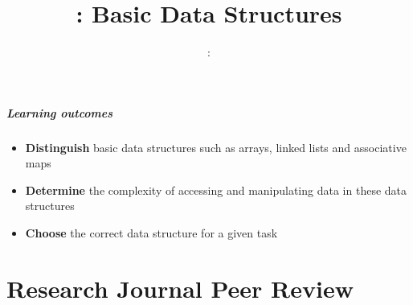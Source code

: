 \usepackage{../../beamerthemeFalmouthGamesAcademy}
\usepackage{multimedia}
\graphicspath{ {../../} }

\lstset{language=Python
}

\usepackage[normalem]{ulem}
\usepackage{wasysym}

\usepackage{algpseudocode}

\usepackage{pdfpages}

\usetikzlibrary{arrows,automata}
\usetikzlibrary{tikzmark,calc}




\title{\sessionnumber: Basic Data Structures}
\subtitle{\modulecode: \moduletitle}

\frame{\titlepage} 

\begin{frame}
	\frametitle{Learning outcomes}
	\begin{itemize}
      \item \textbf{Distinguish} basic data structures such as arrays, linked lists and associative maps
      \item \textbf{Determine} the complexity of accessing and manipulating data in these data structures
      \item \textbf{Choose} the correct data structure for a given task
	\end{itemize}
\end{frame}

\part{Research Journal Peer Review}
\frame{\partpage}






